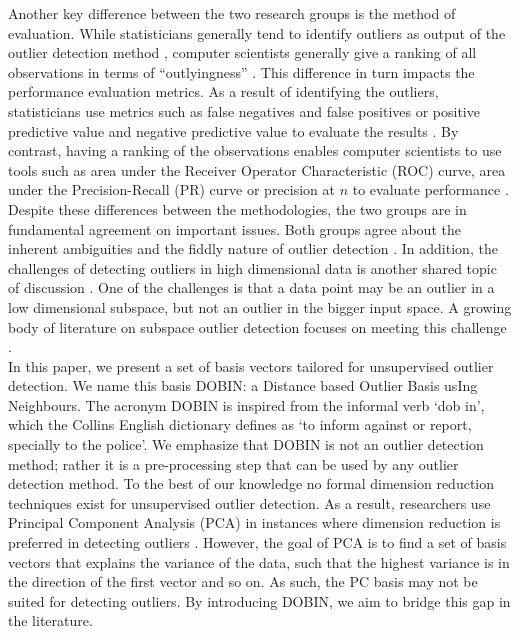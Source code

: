 \documentclass[11pt]{article}
\begin{document}
Another key difference between the two research groups is the method of evaluation. While statisticians generally tend to identify outliers as output of the outlier detection method \citep{billor2000bacon, wilkinson2017visualizing, rousseeuw2018detecting}, computer scientists generally give a ranking of all observations in terms of ``outlyingness'' \citep{breunig2000lof, liu2008isolation, kriegel2009loop}. This difference in turn impacts the performance evaluation metrics. As a result of identifying the outliers, statisticians use metrics such as false negatives and  false positives or positive predictive value and negative predictive value to evaluate the results \citep{wilkinson2017visualizing}. By contrast,  having a ranking of the observations enables computer scientists to use tools such as area under the Receiver Operator Characteristic (ROC) curve, area under the Precision-Recall (PR) curve or precision at $n$ to evaluate performance \citep{campos2016evaluation}. \\

Despite these differences between the methodologies, the two groups are in fundamental agreement on important issues. Both groups agree about the inherent ambiguities and the fiddly nature of outlier detection \citep{unwin2019multivariate, campos2016evaluation}. In addition, the challenges of detecting outliers in high dimensional data is another shared topic of discussion \citep{unwin2019multivariate, zimek2012survey}. One of the challenges is that a data point may be an outlier in a low dimensional subspace, but not an outlier in the bigger input space. A growing body of literature on subspace outlier detection  focuses on meeting this challenge \citep{aggarwal2001outlier, keller2012hics}. \\

In this paper, we present a set of basis vectors tailored for unsupervised outlier detection. We name this basis DOBIN: a Distance based Outlier Basis usIng Neighbours. The acronym DOBIN is inspired from the informal verb `dob in', which the Collins English dictionary defines as `to inform against or report, specially to the police'.  We emphasize that DOBIN is not an outlier detection method;  rather it is a pre-processing step that can be used by any outlier detection method. To the best of our knowledge no formal dimension reduction techniques exist for unsupervised outlier detection. As a result, researchers use Principal Component Analysis (PCA) in instances where dimension reduction is preferred in detecting outliers \citep{talagala2019anomaly, hyndman2015large}. However, the goal of PCA is to find a set of basis vectors that explains the variance of the data, such that the highest variance  is in the direction of the first vector and so on. As such, the PC basis may not be suited for detecting outliers. By introducing DOBIN, we aim to bridge this gap in the literature.   \\
\end{document}
